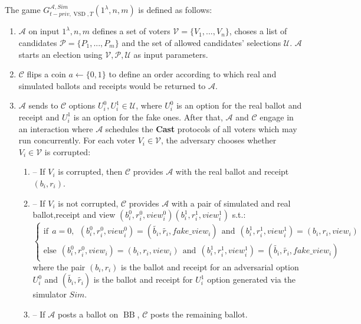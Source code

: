 \documentclass[12pt]{article}
\DeclareMathOperator{\vsd}{VSD}
\DeclareMathOperator{\bb}{BB}
\begin{document}
 
The game $G_{t-priv, \vsd,T}^{\mathcal{A},Sim}(1^{\lambda},n,m)$ is defined as follows:
\begin{enumerate} 
\item $\mathcal{A}$ on input $1^{\lambda},n,m$ defines a set of voters  $\mathcal{V} = \{V_1,...,V_n\}$, choses a list of candidates  $\mathcal{P} = \{P_1,...,P_m\}$ and the set of allowed candidates' selections $\mathcal{U}$.  $\mathcal{A}$ starts an election using $\mathcal{V}, \mathcal{P}, \mathcal{U}$ as input parameters.
\item $\mathcal{C}$ flips a coin $a \leftarrow \{0,1\}$ to define an order according to which real and simulated ballots and receipts would be returned to $\mathcal{A}$.
\item   $\mathcal{A}$ sends to  $\mathcal{C}$ options $U_i^0, U_i^1 \in  \mathcal{U}$, where $U_i^0$ is an option for the real ballot and receipt and $U_i^1$ is an option for the fake ones.  After that, $\mathcal{A}$ and $\mathcal{C}$ engage in an interaction where $\mathcal{A}$ schedules the \textbf{Cast}   protocols of all voters which may run concurrently. For each voter $V_i \in \mathcal{V}$, the adversary chooses whether $V_i \in \mathcal{V}$ is corrupted: 
\begin{enumerate}
\item[] -- If $V_i$ is corrupted, then $\mathcal{C}$ provides $\mathcal{A}$ with the real ballot and receipt $(b_i,r_i)$.
\item[] --  If $V_i$ is not corrupted, $\mathcal{C}$  provides $\mathcal{A}$ with a pair of simulated and real ballot,receipt and view $(b_i^0, r_i^0,view_i^0) (b_i^1, r_i^1,view_i^1)$ s.t.:\\
$ \begin{cases}
 \text{if} ~~a =0,~~ (b_i^0,r_i^0,view_i^0) = (\tilde{b_i},\tilde{r_i},fake\_view_i) ~~ \text{and} ~~  (b_i^1,r_i^1,view_i^1) = (b_i,r_i,view_i)   \\ 
 \text{else}~~ (b_i^0,r_i^0,view_i) =(b_i,r_i,view_i)~~  \text{and} ~~  (b_i^1,r_i^1,view_i^1) =(\tilde{b_i},\tilde{r_i},fake\_view_i)
\end{cases}$\\ 
where the pair $(b_i, r_i)$ is the ballot and receipt for an adversarial option $U_i^0$ and $(\tilde{b_i},\tilde{r_i})$ is the ballot and receipt for  $U_i^1$ option generated via the simulator $Sim$.
\item[] --  If  $\mathcal{A}$ posts a ballot on $\bb$, $\mathcal{C}$ posts the remaining ballot. 
\end{enumerate}

\end{enumerate}
\end{document}
